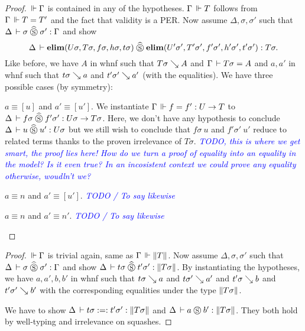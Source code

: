\documentclass[a4paper,english]{lipics-utf8x}
\newcommand\meta[1]{\noindent\textcolor{blue}{\emph{#1}}}
\begin{document}
  \begin{proof}
    $\,\Vdash \Gamma$ is contained in any of the hypotheses.
    $\Gamma \,\Vdash T$ follows from $\Gamma \,\Vdash T = T'$ and the fact that validity
    is a PER.
    Now assume $\Delta, \sigma, \sigma'$ such that
    $\Delta \,\vdash \sigma \mathrel{\widehat{\mathrel{\circledS}}} \sigma' : \Gamma$ and
    show
    \[\Delta \,\vdash \operatorname{\mathbf{elim}}(U \sigma,T \sigma,f \sigma,h \sigma,t \sigma) \mathrel{\widehat{\mathrel{\circledS}}}
    \operatorname{\mathbf{elim}}(U' \sigma',T' \sigma',f' \sigma',h' \sigma',t' \sigma') : T \sigma.\]
    Like before, we have $A$ in whnf such that $T \sigma \searrow A$ and
    $\Gamma \,\vdash T \sigma = A$ and $a,a'$ in whnf such that $t \sigma \searrow a$
    and $t' \sigma' \searrow a'$ (with the equalities).
    We have three possible cases (by symmetry):
    \begin{caselist}
      \nextcase $a \equiv [u]$ and $a' \equiv [u']$.
      We instantiate $\Gamma \,\Vdash f = f' : U \to T$ to
      $\Delta \,\vdash f \sigma \mathrel{\widehat{\mathrel{\circledS}}} f' \sigma' : U \sigma \to T \sigma$.
      Here, we don't have any hypothesis to conclude
      $\Delta \,\vdash u \mathrel{\widehat{\mathrel{\circledS}}} u' : U \sigma$ but we still wish to conclude that
      $f \sigma\ u$ and $f' \sigma'\ u'$ reduce to related terms thanks to
      the proven irrelevance of $T \sigma$.
      \meta{TODO, this is where we get smart, the proof lies here!}
      \meta{How do we turn a proof of equality into an equality in the model?
      Is it even true? In an incosistent context we could prove any equality
      otherwise, woudln't we?}

      \nextcase $a \equiv n$ and $a' \equiv [u']$.
      \meta{TODO / To say likewise}

      \nextcase $a \equiv n$ and $a' \equiv n'$.
      \meta{TODO / To say likewise}
    \end{caselist}
  \end{proof}

  \begin{lemma}
    \leavevmode
    \begin{mathc}
    \end{mathc}
  \end{lemma}

  \begin{proof}
    $\,\Vdash \Gamma$ is trivial again, same as $\Gamma \,\Vdash \|T\|$.
    Now assume $\Delta, \sigma, \sigma'$ such that
    $\Delta \,\vdash \sigma \mathrel{\widehat{\mathrel{\circledS}}} \sigma' : \Gamma$ and
    show $\Delta \,\vdash t \sigma \mathrel{\widehat{\mathrel{\circledS}}} t' \sigma' : \|T \sigma\|$.
    By instantiating the hypotheses, we have $a,a',b,b'$ in whnf such that
    $t \sigma \searrow a$ and $t \sigma' \searrow a'$ and $t' \sigma \searrow b$
    and $t' \sigma' \searrow b'$ with the corresponding equalities under the type
    $\|T \sigma\|$.

    We have to show $\Delta \,\vdash t \sigma :=: t' \sigma' : \|T \sigma\|$
    and $\Delta \,\vdash a \mathrel{\circledS} b' : \|T \sigma\|$. They both hold by
    well-typing and irrelevance on squashes.
  \end{proof}
\end{document}
